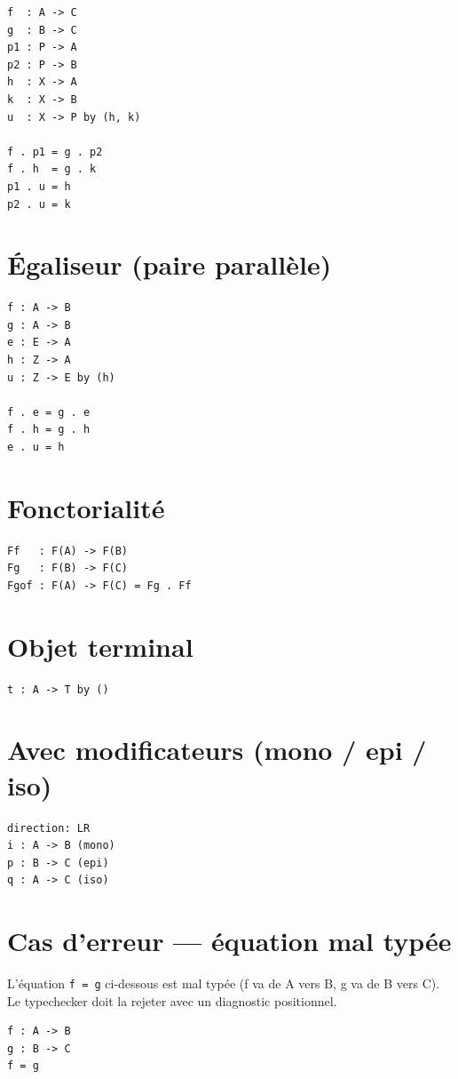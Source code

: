 \documentclass[11pt,a4paper]{article}
\theoremstyle{definition}
\begin{document}
\begin{lstlisting}
f  : A -> C
g  : B -> C
p1 : P -> A
p2 : P -> B
h  : X -> A
k  : X -> B
u  : X -> P by (h, k)

f . p1 = g . p2
f . h  = g . k
p1 . u = h
p2 . u = k
\end{lstlisting}


\section{Égaliseur (paire parallèle)}

\begin{lstlisting}
f : A -> B
g : A -> B
e : E -> A
h : Z -> A
u : Z -> E by (h)

f . e = g . e
f . h = g . h
e . u = h
\end{lstlisting}


\section{Fonctorialité}

\begin{lstlisting}
Ff   : F(A) -> F(B)
Fg   : F(B) -> F(C)
Fgof : F(A) -> F(C) = Fg . Ff
\end{lstlisting}


\section{Objet terminal}

\begin{lstlisting}
t : A -> T by ()
\end{lstlisting}


\section{Avec modificateurs (mono / epi / iso)}

\begin{lstlisting}
direction: LR
i : A -> B (mono)
p : B -> C (epi)
q : A -> C (iso)
\end{lstlisting}


\section{Cas d'erreur — équation mal typée}

L'équation \texttt{f = g} ci-dessous est mal typée (f va de A vers B, g va de
B vers C). Le typechecker doit la rejeter avec un diagnostic positionnel.


\begin{lstlisting}
f : A -> B
g : B -> C
f = g
\end{lstlisting}
\end{document}
